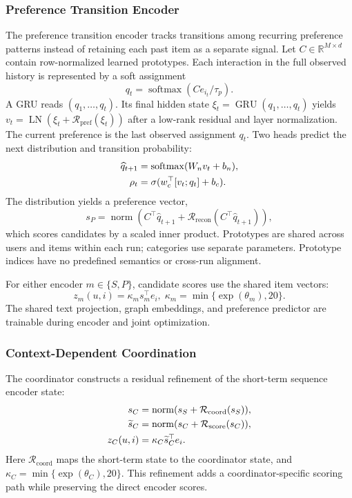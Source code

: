 \documentclass[11pt]{article}
\newcommand{\norm}[1]{\operatorname{norm}(#1)}
\newcommand{\softmax}{\operatorname{softmax}}
\begin{document}
\subsubsection{Preference Transition Encoder}
The preference transition encoder tracks transitions among recurring preference patterns instead of retaining each past item as a separate signal.
Let $C\in\mathbb R^{M\times d}$ contain row-normalized learned prototypes. Each interaction in the full observed history is represented by a soft assignment
\begin{equation}
 q_t=\softmax(Ce_{i_t}/\tau_p).
\end{equation}
A GRU reads $(q_1,\ldots,q_t)$. Its final hidden state $\xi_t=\operatorname{GRU}(q_1,\ldots,q_t)$ yields $v_t=\operatorname{LN}(\xi_t+\mathcal R_{\mathrm{pref}}(\xi_t))$ after a low-rank residual and layer normalization. The current preference is the last observed assignment $q_t$. Two heads predict the next distribution and transition probability:
\begin{align}
 \widehat q_{t+1}&=\softmax(W_n v_t+b_n),\notag\\
 \rho_t&=\sigma(w_c^\top[v_t;q_t]+b_c).
\end{align}
The distribution yields a preference vector,
\begin{equation}
 s_P=\norm{C^\top\widehat q_{t+1}+\mathcal R_{\mathrm{recon}}(C^\top\widehat q_{t+1})},
\end{equation}
which scores candidates by a scaled inner product. Prototypes are shared across users and items within each run; categories use separate parameters. Prototype indices have no predefined semantics or cross-run alignment.

For either encoder $m\in\{S,P\}$, candidate scores use the shared item vectors:
\begin{equation}
 z_m(u,i)=\kappa_m s_m^\top e_i,\;
 \kappa_m=\min\{\exp(\theta_m),20\}.
\end{equation}
The shared text projection, graph embeddings, and preference predictor are trainable during encoder and joint optimization.

\subsubsection{Context-Dependent Coordination}
The coordinator constructs a residual refinement of the short-term sequence encoder state:
\begin{align}
 s_C&=\norm{s_S+\mathcal R_{\mathrm{coord}}(s_S)},\notag\\
 \widetilde s_C&=\norm{s_C+\mathcal R_{\mathrm{score}}(s_C)},\notag\\
 z_C(u,i)&=\kappa_C\widetilde s_C^\top e_i.
\end{align}
Here $\mathcal R_{\mathrm{coord}}$ maps the short-term state to the coordinator state, and $\kappa_C=\min\{\exp(\theta_C),20\}$. This refinement adds a coordinator-specific scoring path while preserving the direct encoder scores.
\end{document}
